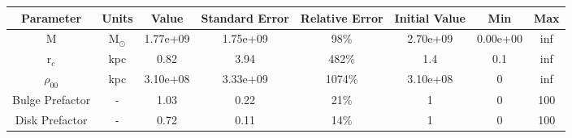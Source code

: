 \begin{tabular}[c]{| c | c | c | c | c | c | c | c |} 
\hline 
    \textbf{Parameter} & \textbf{Units} & \textbf{Value} & \textbf{Standard Error} & \textbf{Relative Error} & \textbf{Initial Value} & \textbf{Min} & \textbf{Max} \\ \hline 
    M & M$_\odot$ & 1.77e+09 & 1.75e+09 & 98\% & 2.70e+09 & 0.00e+00 & inf \\ \hline 
    r$_c$ & kpc & 0.82 & 3.94 & 482\% & 1.4 & 0.1 & inf \\ \hline 
    $\rho_{00}$ & kpc & 3.10e+08 & 3.33e+09 & 1074\% & 3.10e+08 & 0 & inf \\ \hline 
    Bulge Prefactor & - & 1.03 & 0.22 & 21\% & 1 & 0 & 100 \\ \hline 
    Disk Prefactor & - & 0.72 & 0.11 & 14\% & 1 & 0 & 100 \\ \hline 
\end{tabular} 

